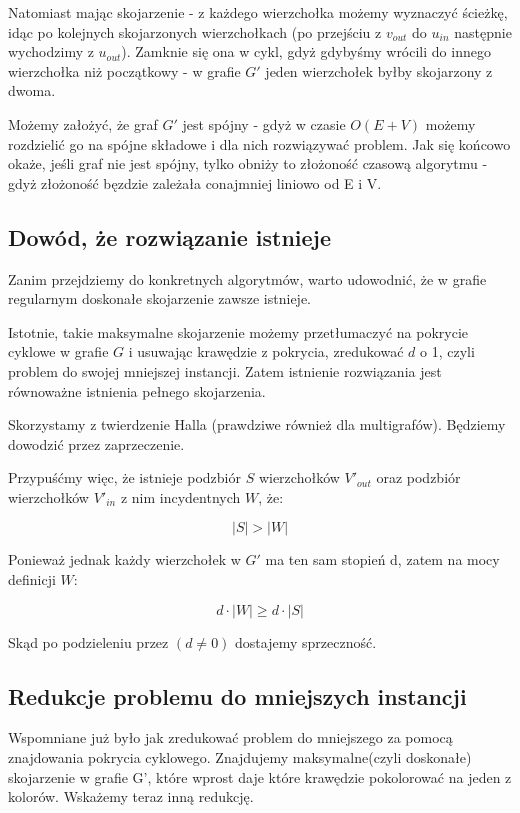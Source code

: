 \documentclass[12pt]{article}
\begin{document}
Natomiast mając skojarzenie - z każdego wierzchołka możemy wyznaczyć ścieżkę, idąc po kolejnych skojarzonych wierzchołkach (po przejściu z $v_{out}$ do $u_{in}$ następnie wychodzimy z $u_{out}$). Zamknie się ona w cykl, gdyż gdybyśmy wrócili do innego wierzchołka niż początkowy - w grafie $G'$ jeden wierzchołek byłby skojarzony z dwoma.

Możemy założyć, że graf $G'$ jest spójny - gdyż w czasie $O(E+V)$ możemy rozdzielić go na spójne składowe i dla nich rozwiązywać problem. Jak się końcowo okaże, jeśli graf nie jest spójny, tylko obniży to złożoność czasową algorytmu - gdyż złożoność bęzdzie zależała conajmniej liniowo od E i V.

\subsection{Dowód, że rozwiązanie istnieje}

Zanim przejdziemy do konkretnych algorytmów, warto udowodnić, że w grafie regularnym doskonałe skojarzenie zawsze istnieje.

Istotnie, takie maksymalne skojarzenie możemy przetłumaczyć na pokrycie cyklowe w grafie $G$ i usuwając krawędzie z pokrycia, zredukować $d$ o 1, czyli problem do swojej mniejszej instancji. Zatem istnienie rozwiązania jest równoważne istnienia pełnego skojarzenia.

Skorzystamy z twierdzenie Halla (prawdziwe również dla multigrafów). Będziemy dowodzić przez zaprzeczenie. 

Przypuśćmy więc, że istnieje podzbiór $S$ wierzchołków $V'_{out}$ oraz podzbiór wierzchołków $V'_{in}$ z nim incydentnych $W$, że:

\[ \left\vert{S}\right\vert > \left\vert{W}\right\vert \]

Ponieważ jednak każdy wierzchołek w $G'$ ma ten sam stopień d, zatem na mocy definicji $W$:

\[ d \cdot \left\vert{W}\right\vert \geq d \cdot \left\vert{S}\right\vert \]

Skąd po podzieleniu przez $(d \neq 0)$ dostajemy sprzeczność.

\subsection{Redukcje problemu do mniejszych instancji}

Wspomniane już było jak zredukować problem do mniejszego za pomocą znajdowania pokrycia cyklowego. Znajdujemy maksymalne(czyli doskonałe) skojarzenie w grafie G', które wprost daje które krawędzie pokolorować na jeden z kolorów. Wskażemy teraz inną redukcję.
\end{document}
